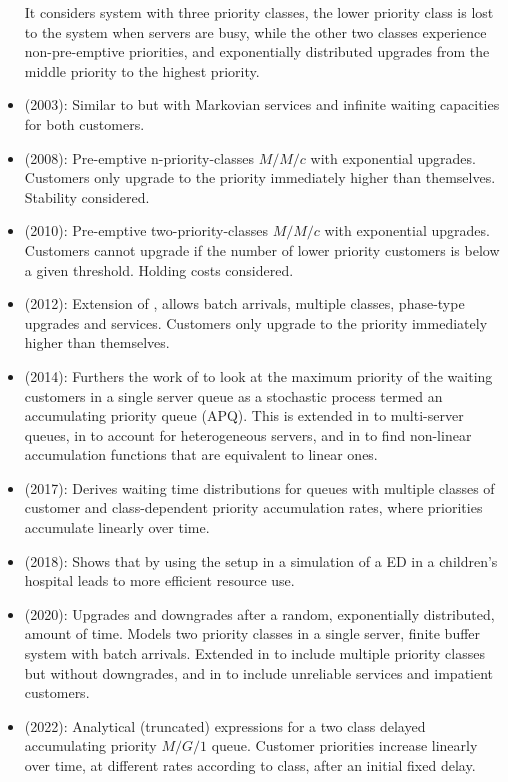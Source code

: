 \documentclass{article}
\begin{document}
\begin{itemize}
      It considers system with three priority classes, the lower priority class
      is lost to the system when servers are busy, while the other two classes
      experience non-pre-emptive priorities, and exponentially distributed
      upgrades from the middle priority to the highest priority.
  \item \cite{knessl03} (2003): Similar to \cite{fratini90} but with Markovian
      services and infinite waiting capacities for both customers.
  \item \cite{xie08} (2008): Pre-emptive n-priority-classes $M/M/c$ with
      exponential upgrades. Customers only upgrade to the priority
        immediately higher than themselves. Stability considered.
  \item \cite{down10} (2010): Pre-emptive two-priority-classes $M/M/c$ with
      exponential upgrades. Customers cannot upgrade if the number of
        lower priority customers is below a given threshold. Holding
        costs considered.
  \item \cite{he12} (2012): Extension of \cite{down10}, allows batch
      arrivals, multiple classes, phase-type upgrades and services.
        Customers only upgrade to the priority immediately higher than
        themselves.
  \item \cite{stanford14} (2014): Furthers the work of \cite{kleinrock164} to
      look at the maximum priority of the waiting customers in a single server
        queue as a stochastic process termed an accumulating priority queue
        (APQ). This is extended in \cite{sharif14} to multi-server queues, in
        \cite{li2016} to account for heterogeneous servers, and in \cite{li2017}
        to find non-linear accumulation functions that are equivalent to linear
        ones.
  \item \cite{kella17} (2017): Derives waiting time distributions for queues
      with multiple classes of customer and class-dependent priority
        accumulation rates, where priorities accumulate linearly over time.
  \item \cite{ferrandetal18} (2018): Shows that by using the \cite{kleinrock164}
      setup in a simulation of a ED in a children's hospital leads to more
        efficient resource use.
  \item \cite{klimenok20} (2020): Upgrades and downgrades after a random,
      exponentially distributed, amount of time. Models two priority classes
        in a single server, finite buffer system with batch arrivals. Extended
        in \cite{leeetal20} to include multiple priority classes but without
        downgrades, and in \cite{dudin21} to include unreliable services and
        impatient customers. 
  \item \cite{bilodeau22} (2022): Analytical (truncated) expressions for
      a two class delayed accumulating priority $M/G/1$ queue. Customer
        priorities increase linearly over time, at different rates
        according to class, after an initial fixed delay.
\end{itemize}
\end{document}
